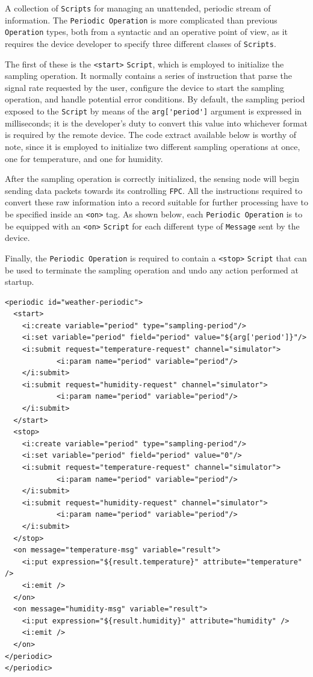 A collection of \texttt{Scripts} for managing an unattended, periodic stream of
information. The \texttt{Periodic Operation} is more complicated than previous
\texttt{Operation} types, both from a syntactic and an operative point of view,
as it requires the device developer to specify three different classes of
\texttt{Scripts}.

The first of these is the \lstinline!<start>! \texttt{Script}, which is
employed to initialize the sampling operation. It normally contains a series of
instruction that parse the signal rate requested by the user, configure the
device to start the sampling operation, and handle potential error conditions.
By default, the sampling period exposed to the \texttt{Script} by means of the
\lstinline!arg['period']! argument is expressed in milliseconds; it is the
developer's duty to convert this value into whichever format is required by the
remote device. The code extract available below is worthy of note, since it is
employed to initialize two different sampling operations at once, one for
temperature, and one for humidity.

After the sampling operation is correctly initialized, the sensing node will
begin sending data packets towards its controlling \texttt{FPC}. All the
instructions required to convert these raw information into a record suitable
for further processing have to be specified inside an \lstinline!<on>! tag. As
shown below, each \texttt{Periodic Operation} is to be equipped with an
\lstinline!<on>! \texttt{Script} for each different type of \texttt{Message}
sent by the device.

Finally, the \texttt{Periodic Operation} is required to contain a
\lstinline!<stop>! \texttt{Script} that can be used to terminate the sampling
operation and undo any action performed at startup.

\lstset{language=XML}
\begin{lstlisting}
<periodic id="weather-periodic">
  <start>
    <i:create variable="period" type="sampling-period"/>
    <i:set variable="period" field="period" value="${arg['period']}"/>
    <i:submit request="temperature-request" channel="simulator">
            <i:param name="period" variable="period"/>
    </i:submit>
    <i:submit request="humidity-request" channel="simulator">
            <i:param name="period" variable="period"/>
    </i:submit>
  </start>
  <stop>
    <i:create variable="period" type="sampling-period"/>
    <i:set variable="period" field="period" value="0"/>
    <i:submit request="temperature-request" channel="simulator">
            <i:param name="period" variable="period"/>
    </i:submit>
    <i:submit request="humidity-request" channel="simulator">
            <i:param name="period" variable="period"/>
    </i:submit>
  </stop>
  <on message="temperature-msg" variable="result">
    <i:put expression="${result.temperature}" attribute="temperature" />
    <i:emit />
  </on>
  <on message="humidity-msg" variable="result">
    <i:put expression="${result.humidity}" attribute="humidity" />
    <i:emit />
  </on>
</periodic>
</periodic>
\end{lstlisting}

